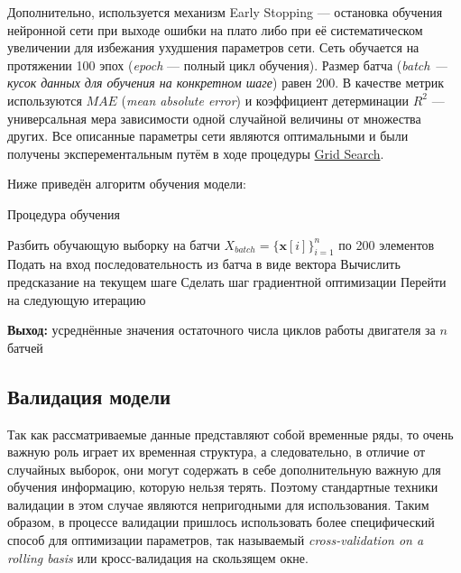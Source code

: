 \documentclass[14pt]{extarticle}
\begin{document}
Дополнительно, используется механизм Early Stopping --- остановка обучения нейронной сети при выходе ошибки на плато либо при её систематическом увеличении для избежания ухудшения параметров сети. Сеть обучается на протяжении 100 эпох ({\it epoch} --- полный цикл обучения). Размер батча ({\it batch --- кусок данных для обучения на конкретном шаге}) равен 200. В качестве метрик используются $MAE$ ({\it mean absolute error}) и коэффициент детерминации $R^2$  --- универсальная мера зависимости одной случайной величины от множества других. Все описанные параметры сети являются оптимальными и были получены эксперементальным путём в ходе процедуры \hyperref[glossary]{Grid Search}.

Ниже приведён алгоритм обучения модели:

\begin{algorithm}[H]
	\caption{{Процедура обучения}}
	
	\begin{algorithmic}[1]
		\STATE Разбить обучающую выборку на батчи $X_{batch} = \{\textbf{x}[i]\}_{i = 1}^{n}$ по 200 элементов
		\STATE Подать на вход последовательность из батча в виде вектора
		\STATE Вычислить предсказание на текущем шаге
		\STATE Сделать шаг градиентной оптимизации
		\STATE Перейти на следующую итерацию
		\ENDFOR
		
		\hspace*{\algorithmicindent} \textbf{Выход:} усреднённые значения остаточного числа циклов работы двигателя за $n$ батчей
	\end{algorithmic}
\end{algorithm}

\subsection{Валидация модели}

Так как рассматриваемые данные представляют собой временные ряды, то очень важную роль играет их временная структура, а следовательно, в отличие от случайных выборок, они могут содержать в себе дополнительную важную для обучения информацию, которую нельзя терять. Поэтому стандартные техники валидации в этом случае являются непригодными для использования. Таким образом, в процессе валидации пришлось использовать более специфический способ для оптимизации параметров, так называемый {\it cross-validation on a rolling basis} или кросс-валидация на скользящем окне. 
\end{document}
